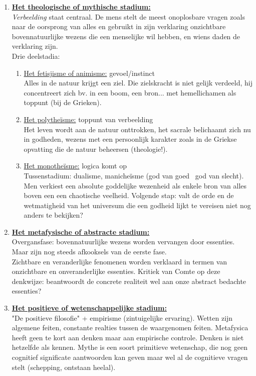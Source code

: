 \documentclass[11pt,a4paper]{article}
\begin{document}
\begin{enumerate}
\item \underline{\textbf{Het theologische of mythische stadium:}}
\\ \emph{Verbeelding} staat centraal.
De mens stelt de meest onoplosbare vragen zoals naar de oorsprong van alles en gebruikt in zijn verklaring onzichtbare bovennatuurlijke wezens die een menselijke wil hebben, en wiens daden de verklaring zijn.
\\
Drie deelstadia:
\begin{enumerate}
\item \underline{Het fetisjisme of animisme:} gevoel/instinct\\
Alles in de natuur krijgt een ziel. Die zielskracht is niet gelijk verdeeld, hij concentreert zich bv. in een boom, een bron... met hemellichamen als toppunt (bij de Grieken).
\item \underline{Het polythe\"isme:} toppunt van verbeelding \\
Het leven wordt aan de natuur onttrokken, het sacrale belichaamt zich nu in godheden, wezens met een persoonlijk karakter zoals in de Griekse opvatting die de natuur beheersen (theologie!).
\item \underline{Het monothe\"isme:} logica komt op\\
Tussenstadium: dualisme, maniche\"isme (god van goed \ god van slecht). Men verkiest een absolute goddelijke wezenheid als enkele bron van alles boven een een chaotische veelheid.
Volgende stap: valt de orde en de wetmatigheid van het universum die een godheid lijkt te vereisen niet nog anders te bekijken?
\end{enumerate}
\item \underline{\textbf{Het metafysische of abstracte stadium:}}\\
Overgansfase: bovennatuurlijke wezens worden vervangen door essenties. Maar zijn nog steeds afkooksels van de eerste fase.\\
Zichtbare en veranderlijke fenomenen worden verklaard in termen van onzichtbare en onveranderlijke essenties. 
Kritiek van Comte op deze denkwijze: beantwoordt de concrete realiteit wel aan onze abstract bedachte essenties?
\item \underline{\textbf{Het positieve of wetenschappelijke stadium:}}\\
"De positieve filosofie" + empirisme (zintuigelijke ervaring). Wetten zijn algemene feiten, constante realties tussen de waargenomen feiten. Metafysica heeft geen te kort aan denken maar aan empirische controle. Denken is niet hetzelfde als kennen.  Mythe is een soort primitieve wetenschap, die nog geen cognitief significate aantwoorden kan geven maar wel al de cognitieve vragen stelt (schepping, ontstaan heelal).

\end{enumerate}
\end{document}

